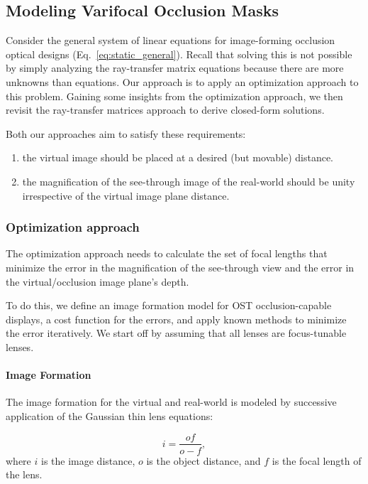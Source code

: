 \subsection{Modeling Varifocal Occlusion Masks}
\label{sec:optical_design:varifocal_occlusion_mask}

Consider the general system of linear equations for image-forming occlusion optical designs (Eq.~\eqref{eq:static_general}). Recall that solving this is not possible by simply analyzing the ray-transfer matrix equations because there are more unknowns than equations. Our approach is to apply an optimization approach to this problem. Gaining some insights from the optimization approach, we then revisit the ray-transfer matrices approach to derive closed-form solutions.

Both our approaches aim to satisfy these requirements:
\begin{enumerate}
   \item  
    the virtual image should be placed at a desired (but movable) distance.
    \item 
    the magnification of the see-through image of the real-world should be unity irrespective of the virtual image plane distance. 
\end{enumerate}

\subsubsection{Optimization approach}
\label{sec:optical_design_optimization}
The optimization approach needs to calculate the set of focal lengths that minimize the error in the magnification of the see-through view and the error in the virtual/occlusion image plane's depth.

To do this, we define an image formation model for OST occlusion-capable displays, a cost function for the errors, and apply known methods to minimize the error iteratively. We start off by assuming that all lenses are focus-tunable lenses.

\paragraph{\textbf{Image Formation}}
The image formation for the virtual and real-world is modeled by successive application of the Gaussian thin lens equations:

\begin{equation}
i = \frac{o f}{o - f},
\label{eq:gaussian_thin_lens_equation}
\end{equation}
where $i$ is the image distance, $o$ is the object distance, and $f$ is the focal length of the lens.

